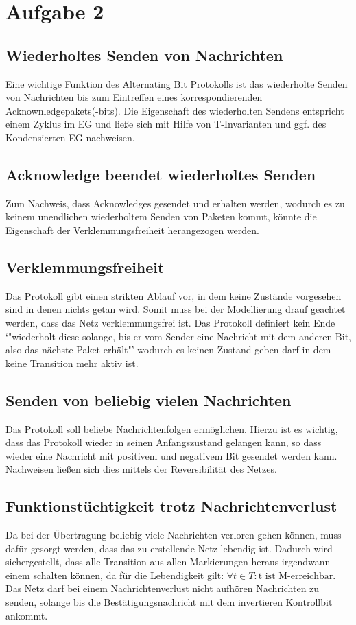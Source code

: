 \documentclass[10pt]{scrartcl}
\begin{document}
\section{Aufgabe 2}

\subsection{Wiederholtes Senden von Nachrichten}
Eine wichtige Funktion des Alternating Bit Protokolls ist das wiederholte Senden von Nachrichten bis zum Eintreffen eines korrespondierenden Acknownledgepakets(-bits).
Die Eigenschaft des wiederholten Sendens entspricht einem Zyklus im EG und ließe sich mit Hilfe von T-Invarianten und ggf. des Kondensierten EG nachweisen.

\subsection{Acknowledge beendet wiederholtes Senden}
Zum Nachweis, dass Acknowledges gesendet und erhalten werden, wodurch es zu keinem unendlichen wiederholtem Senden von Paketen kommt, könnte die Eigenschaft der Verklemmungsfreiheit herangezogen werden.

\subsection{Verklemmungsfreiheit}
Das Protokoll gibt einen strikten Ablauf vor, in dem keine Zustände vorgesehen sind in denen nichts getan wird. Somit muss bei der Modellierung drauf geachtet werden, dass das Netz verklemmungsfrei ist. Das Protokoll definiert kein Ende `"wiederholt diese solange, bis er vom Sender eine Nachricht mit dem anderen Bit, also das nächste Paket erhält"' wodurch es keinen Zustand geben darf in dem keine Transition mehr aktiv ist.

\subsection{Senden von beliebig vielen Nachrichten}
Das Protokoll soll beliebe Nachrichtenfolgen ermöglichen.
Hierzu ist es wichtig, dass das Protokoll wieder in seinen Anfangszustand gelangen kann, so dass wieder eine Nachricht mit positivem und negativem Bit gesendet werden kann.
Nachweisen ließen sich dies mittels der Reversibilität des Netzes.

\subsection{Funktionstüchtigkeit trotz Nachrichtenverlust}
Da bei der Übertragung beliebig viele Nachrichten verloren gehen können, muss dafür gesorgt werden, dass das zu erstellende Netz lebendig ist. Dadurch wird sichergestellt, dass alle Transition aus allen Markierungen heraus irgendwann einem schalten können, da für die Lebendigkeit gilt: $\forall t \in T : \text{t ist M-erreichbar}$. Das Netz darf bei einem Nachrichtenverlust nicht aufhören Nachrichten zu senden, solange bis die Bestätigungsnachricht mit dem invertieren Kontrollbit ankommt.
\end{document}
